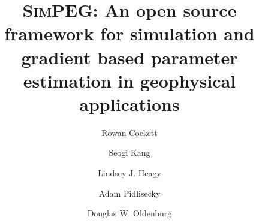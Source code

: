 \documentclass[preprint,review,3p,times,onecolumn,authoryear]{elsarticle}
\newcommand{\SimPEG}{\textsc{SimPEG}\xspace}
\begin{document}
\begin{frontmatter}



{%
\title{\SimPEG: An open source framework for simulation and gradient based
parameter estimation in geophysical applications}

\author[UBC1]{Rowan Cockett}
\author[UBC]{Seogi Kang}
\author[UBC]{Lindsey J. Heagy}
\author[UofC]{Adam Pidlisecky}
\author[UBC]{Douglas W. Oldenburg}

\address[UBC1]{Corresponding Author. Phone: 1(604)358-7696, Email: rcockett[at]eos.ubc.ca}
\address[UBC]{Geophysical Inversion Facility, University of British Columbia}
\address[UofC]{University of Calgary}

}
\end{frontmatter}
\end{document}
